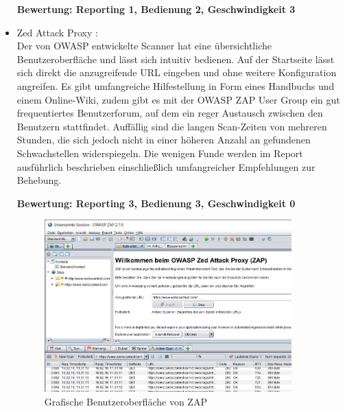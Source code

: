 \documentclass[12pt,oneside,a4paper,parskip,pointlessnumbers]{scrbook}
\begin{document}
\begin{itemize}
            \textbf{Bewertung: Reporting 1, Bedienung 2, Geschwindigkeit 3}

          \item Zed Attack Proxy \cite{ZAP}:\\
            Der von OWASP entwickelte Scanner hat eine übersichtliche Benutzeroberfläche und lässt sich intuitiv bedienen. Auf der Startseite lässt sich direkt die anzugreifende URL eingeben und ohne weitere Konfiguration angreifen. Es gibt umfangreiche Hilfestellung in Form eines Handbuchs und einem Online-Wiki, zudem gibt es mit der OWASP ZAP User Group ein gut frequentiertes Benutzerforum, auf dem ein reger Austausch zwischen den Benutzern stattfindet.
            Auffällig sind die langen Scan-Zeiten von mehreren Stunden, die sich jedoch nicht in einer höheren Anzahl an gefundenen Schwachstellen widerspiegeln. Die wenigen Funde werden im Report ausführlich beschrieben einschließlich umfangreicher Empfehlungen zur Behebung.

            \textbf{Bewertung: Reporting 3, Bedienung 3, Geschwindigkeit 0}
          \begin{figure}[H]
            \centering
            \includegraphics[width=0.9\textwidth]{Images/ZAP}
            \caption[Grafische Benutzeroberfläche von ZAP]{Grafische Benutzeroberfläche von ZAP}
          \end{figure}
        \end{itemize}
\end{document}
